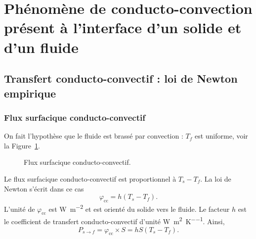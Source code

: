 \section[Conducto-convection]{Phénomène de conducto-convection\texorpdfstring{\\}{ }présent à l'interface d'un solide et d'un fluide}

    \subsection{Transfert conducto-convectif : loi de Newton empirique}

        \subsubsection{Flux surfacique conducto-convectif}

            On fait l'hypothèse que le fluide est brassé par convection : $T_{f}$ est uniforme, voir la Figure~\ref{fig:transfert_conducto_convectif_fluide_brasse}.

            \begin{figure}
                \centering
                \caption{Flux surfacique conducto-convectif.}    
                \label{fig:transfert_conducto_convectif_fluide_brasse}
            \end{figure}

            Le flux surfacique conducto-convectif est proportionnel à $T_s-T_f$. La loi de Newton s'écrit dans ce cas
            \begin{equation*}
                \boxed{
                    \varphi_{\text{cc}}=h\left(T_s-T_f\right).
                }
            \end{equation*}
            L'unité de $\varphi_{\text{cc}}$ est \si[]{\watt\per\metre\squared} et est orienté du solide vers le fluide. Le facteur $h$ est le coefficient de transfert conducto-convectif d'unité \si[]{\watt\per\metre\squared\per\kelvin}.
            Ainsi,
            \begin{equation*}
                \boxed{
                    P_{s\to f}=\varphi_{\text{cc}}\times S=hS\left(T_s-T_f\right).
                }
            \end{equation*}

